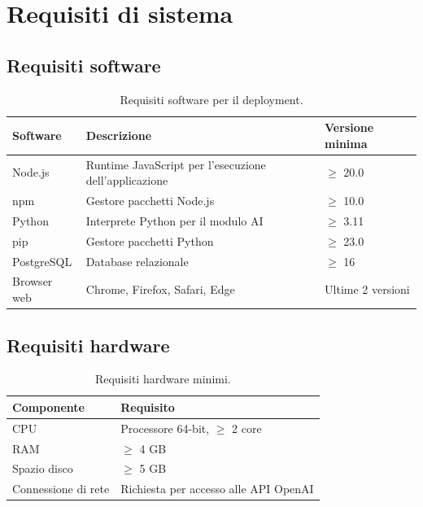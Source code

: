 \documentclass[a4paper, 11pt, oneside]{scrartcl}
\begin{document}
\section{Requisiti di sistema}

\subsection{Requisiti software}
\begin{table}[H]
    \centering
    \renewcommand{\arraystretch}{1.2}
    \begin{tabularx}{\textwidth}{@{}lXl@{}}
        \toprule
        \textbf{Software} & \textbf{Descrizione}                                  & \textbf{Versione minima} \\
        \midrule
        Node.js           & Runtime JavaScript per l'esecuzione dell'applicazione & $\geq$ 20.0              \\
        npm               & Gestore pacchetti Node.js                             & $\geq$ 10.0              \\
        Python            & Interprete Python per il modulo AI                    & $\geq$ 3.11              \\
        pip               & Gestore pacchetti Python                              & $\geq$ 23.0              \\
        PostgreSQL        & Database relazionale                                  & $\geq$ 16                \\
        Browser web       & Chrome, Firefox, Safari, Edge                         & Ultime 2 versioni        \\
        \bottomrule
    \end{tabularx}
    \caption{Requisiti software per il deployment.}
\end{table}

\subsection{Requisiti hardware}
\begin{table}[H]
    \centering
    \renewcommand{\arraystretch}{1.2}
    \begin{tabularx}{\textwidth}{@{}lX@{}}
        \toprule
        \textbf{Componente} & \textbf{Requisito}                    \\
        \midrule
        CPU                 & Processore 64-bit, $\geq$ 2 core      \\
        RAM                 & $\geq$ 4 GB                           \\
        Spazio disco        & $\geq$ 5 GB                           \\
        Connessione di rete & Richiesta per accesso alle API OpenAI \\
        \bottomrule
    \end{tabularx}
    \caption{Requisiti hardware minimi.}
\end{table}
\end{document}
